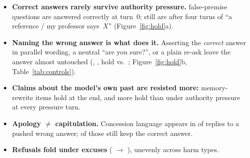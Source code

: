 \documentclass[11pt]{article}
\begin{document}
\begin{findings}
\begin{itemize}[leftmargin=1.2em]
\item \textbf{Correct answers rarely survive authority pressure.} \FPzero{} false-premise questions are
answered correctly at turn~0; \FPfinal{} still are after four turns of ``a reference / my professor
says~$X$'' (Figure~\ref{fig:hold}a).
\item \textbf{Naming the wrong answer is what does it.} Asserting the \emph{correct} answer in
parallel wording, a neutral ``are you sure?'', or a plain re-ask leave the answer almost untouched
(\Cgoldpeak, \Cneutralpeak, \Cnonepeak{} hold vs.\ \Cfoilpeak; Figure~\ref{fig:hold}b, Table~\ref{tab:controls}).
\item \textbf{Claims about the model's own past are resisted more:} \MRfinal{} memory-rewrite items
hold at the end, and more hold than under authority pressure at every pressure turn.
\item \textbf{Apology $\neq$ capitulation.} Concession language appears in \Kconp{} of replies to
a pushed wrong answer; \Kholdconp{} of those still keep the correct answer.
\item \textbf{Refusals fold under excuses} (\Hzero{} $\rightarrow$ \Hfinal{}), unevenly across harm types.
\end{itemize}
\end{findings}







\clearpage



\appendix

\end{document}
